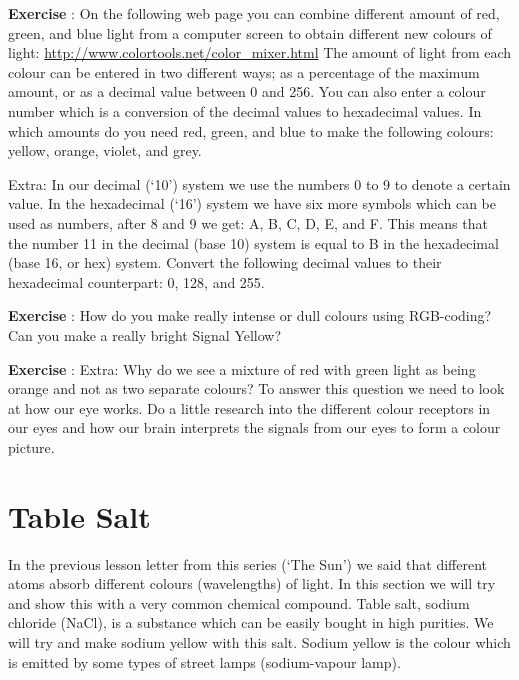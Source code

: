 \begin{shaded}
\textbf{Exercise \theExercise {}} : On the following web page you can combine different amount of red, green, and blue light from a computer screen to obtain different new colours of light: \url{http://www.colortools.net/color_mixer.html}
The amount of light from each colour can be entered in two different ways; as a percentage of the maximum amount, or as a decimal value between 0 and 256. You can also enter a colour number which is a conversion of the decimal values to hexadecimal values.
In which amounts do you need red, green, and blue to make the following colours: yellow, orange, violet, and grey.

Extra: In our decimal (`10') system we use the numbers 0 to 9 to denote a certain value. In the hexadecimal (`16') system we have six more symbols which can be used as numbers, after 8 and 9 we get: A, B, C, D, E, and F. This means that the number 11 in the decimal (base 10) system is equal to B in the hexadecimal (base 16, or hex) system. Convert the following decimal values to their hexadecimal counterpart: 0, 128, and 255.\end{shaded}
\begin{shaded}
\textbf{Exercise \theExercise {}} : How do you make really intense or dull colours using RGB-coding? Can you make a really bright Signal Yellow?\end{shaded}
\begin{shaded}
\textbf{Exercise \theExercise {}} : Extra: Why do we see a mixture of red with green light as being orange and not as two separate colours? To answer this question we need to look at how our eye works. Do a little research into the different colour receptors in our eyes and how our brain interprets the signals from our eyes to form a colour picture.\end{shaded}


\section{Table Salt}
In the previous lesson letter from this series (`The Sun') we said that different atoms absorb different colours (wavelengths) of light. In this section we will try and show this with a very common chemical compound. Table salt, sodium chloride (NaCl), is a substance which can be easily bought in high purities. We will try and make sodium yellow with this salt. Sodium yellow is the colour which is emitted by some types of street lamps (sodium-vapour lamp).

